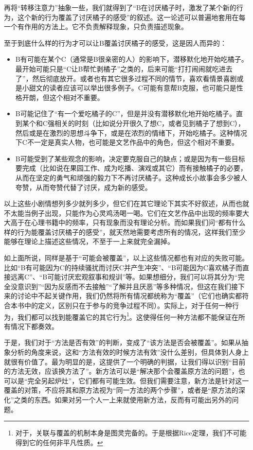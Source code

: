 再将“转移注意力”抽象一些，我们就得到了“B在讨厌橘子时，激发了某个新的行为，这个新的行为覆盖了讨厌橘子的感受”的叙述。这一论述可以普遍地套用在每一个有作用的方法上。它不负责解释现象，只负责描述现象。
\begin{explain}
至于到底什么样的行为才可以让B覆盖讨厌橘子的感受，这是因人而异的：
\begin{itemize}
\item B有可能在某个C（通常是B很亲密的人）的影响下，潜移默化地开始吃橘子。最开始可能只是“C让B帮忙剥橘子”之类的，后来可能“打打闹闹就吃进去了”，然后彻底放开。或者也有其它很多过程不同的情节，喜欢看情景喜剧或是小甜文的读者应该可以举出很多例子。C可能有意帮B克服，也可能只是性格开朗，但这个相对不重要。
\item B可能记住了“有一个爱吃橘子的C”，但是并没有潜移默化地开始吃橘子。直到某个和C强相关的时刻（比如说分开很久了想C，或者见到橘子了想到C），然后或是在激烈的思想斗争下，或是在浓烈的情绪下，开始吃橘子。这种情况下C不一定是真实人物，也可能是文艺作品中的角色，但这个相对不重要。
\item B可能受到了某些观念的影响，决定要克服自己的缺点；或是因为有一些目标要完成（比如说在果园工作、成为吃播、演戏或其它）而有接触橘子的必要，从而在坚定的勇气和顽强的毅力下不再讨厌橘子。这种成长小故事会多少被人夸赞，从而夸赞代替了讨厌，成为新的感受。
\end{itemize}
\end{explain}
以上这些小剧情想列多少就列多少，但它们在其它理论下其实不好叙述，从而也就不太能当例子出现，只能作为心灵鸡汤喝一喝。它们在文艺作品中出现的频率要大大高于在心理书籍中的频率，只有现象而没有理论分析。而如果我们问“都有什么样的行为能覆盖讨厌橘子的感受”，就天然地需要考虑所有的情况，这样我们至少能够在理论上描述这些情况，不至于一上来就完全漏掉。

如上面所说，同样是基于“可能会被覆盖”，以上这些情况都也有对应的失败可能。比如“B有可能因为C的持续骚扰而讨厌C并产生冲突”、“B可能因为C喜欢橘子而直接远离C”、“B可能讨厌宏观叙事和规训”等。如果想细分，我们可以将其分为“完全没意识到”“因为反感而不去接触”“了解并且厌恶”等多种情况，但这在我们接下来的讨论中不起关键作用，我们仍然将所有情况都统称为“覆盖”（它们也确实都符合本书中的定义，区别只在于参与的竞争过程不同）。实际上，对于任何一种行为，我们都可以找到能覆盖它的其它行为\footnote{对于\trained，关联与覆盖的机制本身是图灵完备的。于是根据Rice定理，我们不可能得到它的任何非平凡性质。}。这使得任何一种方法都不能保证在所有情况下都奏效。

于是，我们对于“方法是否有效”的判断，变成了“该方法是否会被覆盖”。如果从抽象分析的角度来说，这和“方法有效的时候方法有效”没什么差别，但具体到人身上就很有价值了。最为明显的是，这提供了一个明确的判据，让我们得以识别“目前的方法无效，应该换方法了”。新方法可以是“解决那个会覆盖原方法的问题”，也可以是“完全另起炉灶”，它们都有可能生效。但我们需要注意，新方法是针对这一覆盖的对策，不应将其和原方法视为“同一方法的两个步骤”，或者是“原方法的深化”之类的东西。如果对另一个人一上来就使用新方法，反而有可能出另外的问题。

